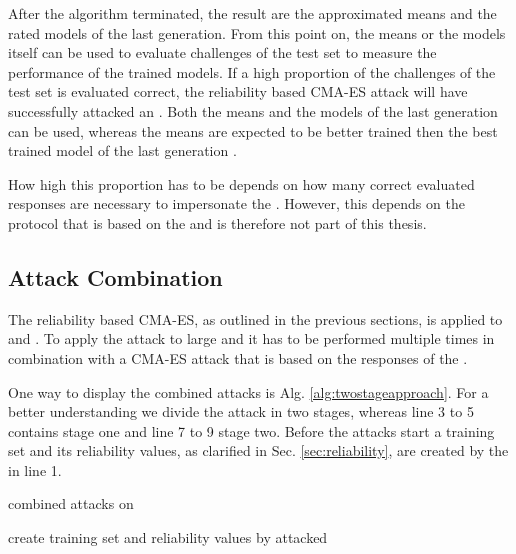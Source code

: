 After the algorithm terminated, the result are the approximated means and the rated models of the last generation.
From this point on, the means or the models itself can be used to evaluate challenges of the test set to measure the performance of the trained models. 
If a high proportion of the challenges of the test set is evaluated correct, the reliability based \ac{CMA-ES} attack will have successfully attacked an \apuf. %
Both the means and the models of the last generation can be used, whereas the means are expected to be better trained then the best trained model of the last generation \cite{Wikipedia2017CMA-ES}.

How high this proportion has to be depends on how many correct evaluated responses are necessary to impersonate the \puf.
However, this depends on the protocol that is based on the \puf and is therefore not part of this thesis.


\subsection{Attack Combination}
\label{sec:attackcombination}

The reliability based \ac{CMA-ES}, as outlined in the previous sections, is applied to \apufs and \mpuf.
To apply the attack to large \xpufs and \mxpuf it has to be performed multiple times in combination with a \ac{CMA-ES} attack that is based on the responses of the \puf \cite{Becker2015ThePUFs}.

One way to display the combined attacks is Alg. \ref{alg:twostageapproach}.
For a better understanding we divide the attack in two stages, whereas line 3 to 5 contains stage one and line 7 to 9 stage two.
Before the attacks start a training set and its reliability values, as clarified in Sec. \ref{sec:reliability}, are created by the \xpuf in line 1.

\SetAlCapHSkip{0.2em}
\begin{algorithm}[H] %
\Indm
\SetAlgoLined
\caption{combined attacks on \xpufs}
\label{alg:twostageapproach}
\Indp

create training set and reliability values by attacked \xpuf\\

\end{algorithm}

